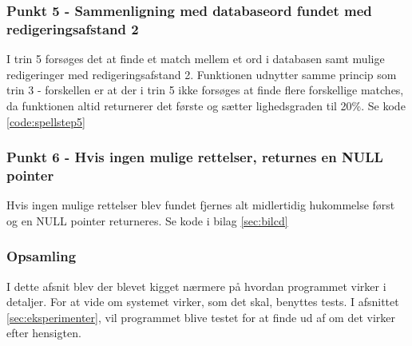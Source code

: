 
\subsubsection*{Punkt 5 - Sammenligning med databaseord fundet med redigeringsafstand 2}

I trin 5 forsøges det at finde et match mellem et ord i databasen samt mulige redigeringer med redigeringsafstand 2. Funktionen udnytter samme princip som trin 3 - forskellen er at der i trin 5 ikke forsøges at finde flere forskellige matches, da funktionen altid returnerer det første og sætter lighedsgraden til 20\%. Se kode \ref{code:spellstep5}


\subsubsection*{Punkt 6 - Hvis ingen mulige rettelser, returnes en NULL pointer}

Hvis ingen mulige rettelser blev fundet fjernes alt midlertidig hukommelse først og en NULL pointer returneres. Se kode i bilag \ref{sec:bilcd}



\subsubsection*{Opsamling}
I dette afsnit blev der blevet kigget nærmere på hvordan programmet virker i detaljer. For at vide om systemet virker, som det skal, benyttes tests. I afsnittet \ref{sec:eksperimenter}, vil programmet blive testet for at finde ud af om det virker efter hensigten.
